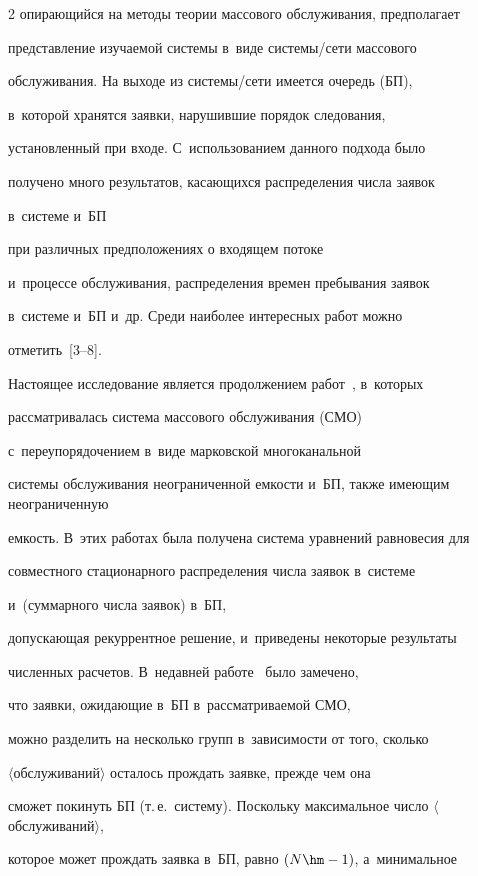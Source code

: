 \begin{multicols}{2}
опирающийся на методы тео\-рии массового обслуживания, предполагает


представление изучаемой сис\-те\-мы в~виде сис\-те\-мы/се\-ти массового


обслуживания. На выходе из системы/сети имеется очередь (БП), 


в~которой хранятся заявки, нарушившие порядок следования,


установленный при входе. С~использованием данного подхода было


получено много результатов, касающихся распределения числа заявок 


в~системе и~БП


 при различных предположениях о входящем потоке 


 и~процессе обслуживания, распределения времен пребывания заявок


в~системе и~БП и~др. Среди наиболее интересных работ можно 


отметить~[3--8].





Настоящее исследование является продолжением работ~\cite{p1, a8}, в~которых


рассматривалась система массового обслуживания (СМО) 


с~переупорядочением в~виде марковской многоканальной


системы обслуживания неограниченной ем\-кости и~БП, также имеющим неограниченную


емкость. В~этих работах была получена система уравнений равновесия для


совместного стационарного распределения числа заявок в~системе


и~(суммарного числа заявок) в~БП,


допускающая рекуррентное решение, и~приведены некоторые результаты


численных расчетов. В~недавней работе~\cite{pr2015} было замечено,


что заявки, ожидающие в~БП в~рассматриваемой СМО,


 можно разделить на несколько групп в~зависимости от того, сколько


$\langle$обслуживаний$\rangle$ осталось прождать заявке, прежде чем она


 сможет покинуть БП (т.\,е.\ систему). Поскольку максимальное число $\langle$обслуживаний$\rangle$,


 которое может прождать заявка в~БП, равно $(N\hm-1)$, а~минимальное



\end{multicols}
